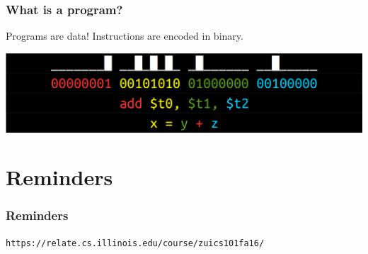 \documentclass[11pt]{beamer}
\begin{document}
\begin{frame}
  \frametitle{What is a program?}
  \Enlarge

  \begin{itemize} \pause
    \myitem Programs are data! \pause
	\myitem Instructions are encoded in binary.
  \end{itemize}
  \includegraphics[width=\textwidth]{./img/assembler-4.png}
\end{frame}

\section{Reminders}

\begin{frame}
  \frametitle{Reminders}
  \Enlarge

  \begin{center}
    \textcolor{\CSBase}{\Small \texttt{https://relate.cs.illinois.edu/course/zuics101fa16/}}
  \end{center}
\end{frame}
\end{document}
